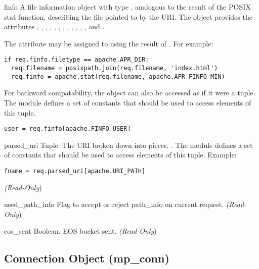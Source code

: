 \begin{memberdesc}[request]{finfo}
  A file information object with type , analogous to the
  result of the POSIX stat function, describing the
  file pointed to by the URI. The object provides the attributes
  , , , ,
  , , , , ,
  , , ,  and .

  The attribute may be assigned to using the result of .
  For example:

  \begin{verbatim}
if req.finfo.filetype == apache.APR_DIR:
  req.filename = posixpath.join(req.filename, 'index.html')
  req.finfo = apache.stat(req.filename, apache.APR_FINFO_MIN)
  \end{verbatim}

  For backward compatability, the object can also be accessed as if it
  were a tuple. The  module defines a set of 
  constants that should be used to access elements of this tuple.

  \begin{verbatim}
user = req.finfo[apache.FINFO_USER]
  \end{verbatim}
\end{memberdesc}

\begin{memberdesc}[request]{parsed_uri}
  Tuple. The URI broken down into pieces.
  . 
  The  module defines a set of  constants that
  should be used to access elements of this tuple. Example:
  \begin{verbatim}
fname = req.parsed_uri[apache.URI_PATH]
  \end{verbatim}
  \emph{(Read-Only})
\end{memberdesc}

\begin{memberdesc}[request]{used_path_info}
  Flag to accept or reject path_info on current request.
  \emph{(Read-Only})
\end{memberdesc}

\begin{memberdesc}[request]{eos_sent}
  Boolean. EOS bucket sent.
  \emph{(Read-Only})
\end{memberdesc}

\subsection{Connection Object (mp_conn)\label{pyapi-mpconn}}

